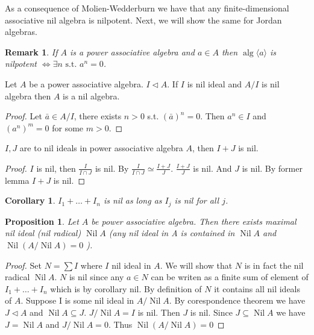 \documentclass{article}
\newtheorem{proposition}[theorem]{Proposition}
\newtheorem{corollary}[theorem]{Corollary}
\newtheorem{remark}[theorem]{Remark}
\begin{document}
As a consequence of Molien-Wedderburn we have that any finite-dimensional associative nil algebra is nilpotent.  
Next, we will show the same for Jordan algebras.  

\begin{remark}  
If $A$ is a power associative algebra and $a \in A$ then $\operatorname{alg}\langle a \rangle$ is nilpotent $\iff \exists n \text{ s.t. } a^n=0$.  
\end{remark} 

\begin{lemma} 
Let $ A $ be a power associative algebra. $ I \triangleleft A $. If $ I $ is nil ideal and $ A/I $ is nil algebra then $ A $ is a nil algebra.     
\end{lemma}

\begin{proof} 
Let $ \bar{a} \in A/I $, there exists $ n>0 $ s.t. $ (\bar{a})^n=0 $. Then $ a^n \in I $ and $ (a^n)^m=0 $ for some $ m > 0 $.
\end{proof}

\begin{lemma} 
$ I,J $ are to nil ideals in power associative algebra $ A $, then $ I+J $ is nil.   
\end{lemma}

\begin{proof} 
$ I $ is nil, then $ \frac{I}{I \cap J} $ is nil. By $\frac{I}{I \cap J} \simeq \frac{I+J}{J}  $. $ \frac{I+J}{J} $ is nil. And $ J $ is nil. By former lemma $ I+J $ is nil.      
\end{proof}

\begin{corollary}
$ I_1 + \ldots + I_n $ is nil as long as $ I_j $ is nil for all $ j $.
\end{corollary}

\begin{proposition}
Let $ A $ be power associative algebra. Then there exists maximal nil ideal (nil radical) $ \operatorname{Nil}A $ (any nil ideal in A is contained in $ \operatorname{Nil}A $ and $ \operatorname{Nil}(A/ \operatorname{Nil}A)=0 $ ).
\end{proposition}

\begin{proof} 
Set $ N = \sum I $ where $ I  $ nil ideal in $ A $. We will show that $ N $ is in fact the nil radical $ \operatorname{Nil}A $. $ N $ is nil since any $ a \in N $ can be writen as a finite sum of element of $ I_1 + \ldots +I_n $ which is by corollary nil. By definition of $ N $ it contains all nil ideals of $ A $. Suppose I is some nil ideal in $ A/\operatorname{Nil}A $. By corespondence theorem we have $ J \triangleleft A $ and $ \operatorname{Nil}A \subseteq J $. $ J / \operatorname{Nil}A=I$ is nil. Then $ J $ is nil. Since $ J \subseteq \operatorname{Nil}A $ we have $ J=\operatorname{Nil}A $ and $ J / \operatorname{Nil}A =0 $. Thus $ \operatorname{Nil}(A/ \operatorname{Nil}A)=0 $                  
\end{proof}
\end{document}

